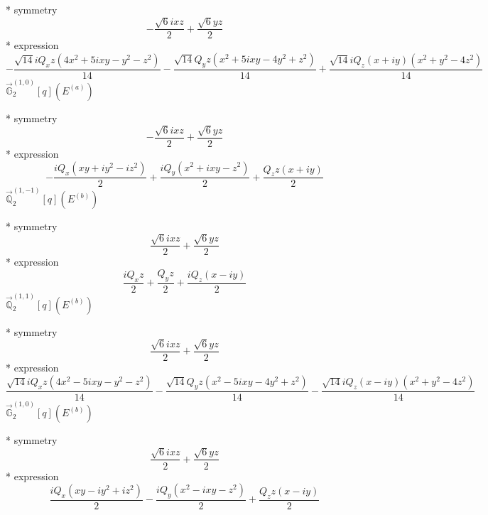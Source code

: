 \documentclass[fleqn,8pt]{jsarticle}
\begin{document}
\noindent\quad ** symmetry
\begin{dmath*}
- \frac{\sqrt{6} i x z}{2} + \frac{\sqrt{6} y z}{2}
\end{dmath*}
\noindent\quad ** expression
\begin{dmath*}
- \frac{\sqrt{14} i Q_{x} z \left(4 x^{2} + 5 i x y - y^{2} - z^{2}\right)}{14} - \frac{\sqrt{14} Q_{y} z \left(x^{2} + 5 i x y - 4 y^{2} + z^{2}\right)}{14} + \frac{\sqrt{14} i Q_{z} \left(x + i y\right) \left(x^{2} + y^{2} - 4 z^{2}\right)}{14}
\end{dmath*}
\noindent\quad $\vec{\mathbb{G}}_{2}^{(1,0)}[q](E^{(a)})$

\noindent\quad ** symmetry
\begin{dmath*}
- \frac{\sqrt{6} i x z}{2} + \frac{\sqrt{6} y z}{2}
\end{dmath*}
\noindent\quad ** expression
\begin{dmath*}
- \frac{i Q_{x} \left(x y + i y^{2} - i z^{2}\right)}{2} + \frac{i Q_{y} \left(x^{2} + i x y - z^{2}\right)}{2} + \frac{Q_{z} z \left(x + i y\right)}{2}
\end{dmath*}
\noindent\quad $\vec{\mathbb{Q}}_{2}^{(1,-1)}[q](E^{(b)})$

\noindent\quad ** symmetry
\begin{dmath*}
\frac{\sqrt{6} i x z}{2} + \frac{\sqrt{6} y z}{2}
\end{dmath*}
\noindent\quad ** expression
\begin{dmath*}
\frac{i Q_{x} z}{2} + \frac{Q_{y} z}{2} + \frac{i Q_{z} \left(x - i y\right)}{2}
\end{dmath*}
\noindent\quad $\vec{\mathbb{Q}}_{2}^{(1,1)}[q](E^{(b)})$

\noindent\quad ** symmetry
\begin{dmath*}
\frac{\sqrt{6} i x z}{2} + \frac{\sqrt{6} y z}{2}
\end{dmath*}
\noindent\quad ** expression
\begin{dmath*}
\frac{\sqrt{14} i Q_{x} z \left(4 x^{2} - 5 i x y - y^{2} - z^{2}\right)}{14} - \frac{\sqrt{14} Q_{y} z \left(x^{2} - 5 i x y - 4 y^{2} + z^{2}\right)}{14} - \frac{\sqrt{14} i Q_{z} \left(x - i y\right) \left(x^{2} + y^{2} - 4 z^{2}\right)}{14}
\end{dmath*}
\noindent\quad $\vec{\mathbb{G}}_{2}^{(1,0)}[q](E^{(b)})$

\noindent\quad ** symmetry
\begin{dmath*}
\frac{\sqrt{6} i x z}{2} + \frac{\sqrt{6} y z}{2}
\end{dmath*}
\noindent\quad ** expression
\begin{dmath*}
\frac{i Q_{x} \left(x y - i y^{2} + i z^{2}\right)}{2} - \frac{i Q_{y} \left(x^{2} - i x y - z^{2}\right)}{2} + \frac{Q_{z} z \left(x - i y\right)}{2}
\end{dmath*}
\end{document}
